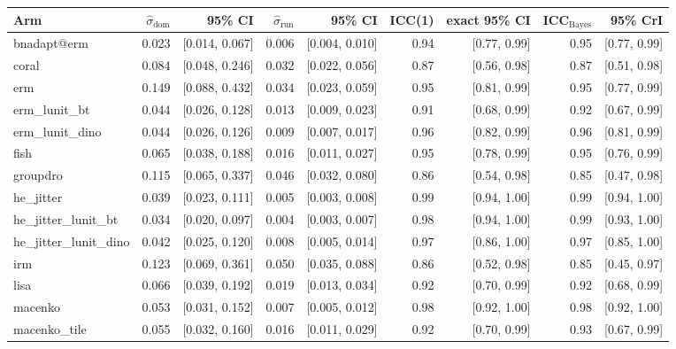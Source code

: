 \begin{tabular}{lrrrrrrrr}
\toprule
Arm & $\hat\sigma_\text{dom}$ & 95\% CI & $\hat\sigma_\text{run}$ & 95\% CI & ICC(1) & exact 95\% CI & ICC$_\text{Bayes}$ & 95\% CrI \\
\midrule
bnadapt@erm & 0.023 & [0.014, 0.067] & 0.006 & [0.004, 0.010] & 0.94 & [0.77, 0.99] & 0.95 & [0.77, 0.99] \\
coral & 0.084 & [0.048, 0.246] & 0.032 & [0.022, 0.056] & 0.87 & [0.56, 0.98] & 0.87 & [0.51, 0.98] \\
erm & 0.149 & [0.088, 0.432] & 0.034 & [0.023, 0.059] & 0.95 & [0.81, 0.99] & 0.95 & [0.77, 0.99] \\
erm\_lunit\_bt & 0.044 & [0.026, 0.128] & 0.013 & [0.009, 0.023] & 0.91 & [0.68, 0.99] & 0.92 & [0.67, 0.99] \\
erm\_lunit\_dino & 0.044 & [0.026, 0.126] & 0.009 & [0.007, 0.017] & 0.96 & [0.82, 0.99] & 0.96 & [0.81, 0.99] \\
fish & 0.065 & [0.038, 0.188] & 0.016 & [0.011, 0.027] & 0.95 & [0.78, 0.99] & 0.95 & [0.76, 0.99] \\
groupdro & 0.115 & [0.065, 0.337] & 0.046 & [0.032, 0.080] & 0.86 & [0.54, 0.98] & 0.85 & [0.47, 0.98] \\
he\_jitter & 0.039 & [0.023, 0.111] & 0.005 & [0.003, 0.008] & 0.99 & [0.94, 1.00] & 0.99 & [0.94, 1.00] \\
he\_jitter\_lunit\_bt & 0.034 & [0.020, 0.097] & 0.004 & [0.003, 0.007] & 0.98 & [0.94, 1.00] & 0.99 & [0.93, 1.00] \\
he\_jitter\_lunit\_dino & 0.042 & [0.025, 0.120] & 0.008 & [0.005, 0.014] & 0.97 & [0.86, 1.00] & 0.97 & [0.85, 1.00] \\
irm & 0.123 & [0.069, 0.361] & 0.050 & [0.035, 0.088] & 0.86 & [0.52, 0.98] & 0.85 & [0.45, 0.97] \\
lisa & 0.066 & [0.039, 0.192] & 0.019 & [0.013, 0.034] & 0.92 & [0.70, 0.99] & 0.92 & [0.68, 0.99] \\
macenko & 0.053 & [0.031, 0.152] & 0.007 & [0.005, 0.012] & 0.98 & [0.92, 1.00] & 0.98 & [0.92, 1.00] \\
macenko\_tile & 0.055 & [0.032, 0.160] & 0.016 & [0.011, 0.029] & 0.92 & [0.70, 0.99] & 0.93 & [0.67, 0.99] \\

\end{tabular}
